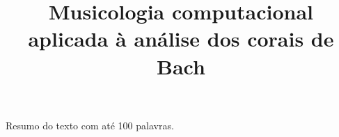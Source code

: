 \documentclass[brazil]{article}
\begin{document}
\graphicspath{{figs/}}

\title{Musicologia computacional aplicada à análise dos corais de Bach}
\author{}{}{}{}

\begin{sumario}
  Resumo do texto com até 100 palavras.  
\end{sumario}






\end{document}
